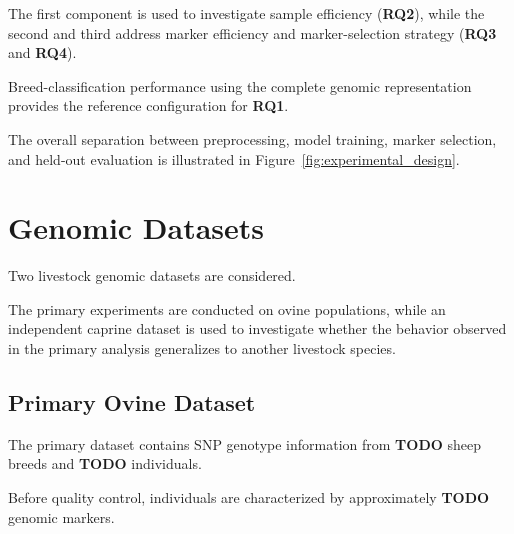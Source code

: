 The first component is used to investigate sample efficiency
(\textbf{RQ2}), while the second and third address marker efficiency
and marker-selection strategy
(\textbf{RQ3} and \textbf{RQ4}).

Breed-classification performance using the complete genomic
representation provides the reference configuration for
\textbf{RQ1}.

The overall separation between preprocessing, model training, marker
selection, and held-out evaluation is illustrated in
Figure~\ref{fig:experimental_design}.







\section{Genomic Datasets}
\label{sec:genomic_datasets_preprocessing}

Two livestock genomic datasets are considered.

The primary experiments are conducted on ovine populations, while
an independent caprine dataset is used to investigate whether the
behavior observed in the primary analysis generalizes to another
livestock species.


\subsection{Primary Ovine Dataset}
\label{subsec:ovine_dataset}

%
%
%
%

The primary dataset contains SNP genotype information from
\textbf{TODO} sheep breeds and
\textbf{TODO} individuals.

Before quality control, individuals are characterized by
approximately \textbf{TODO} genomic markers.

